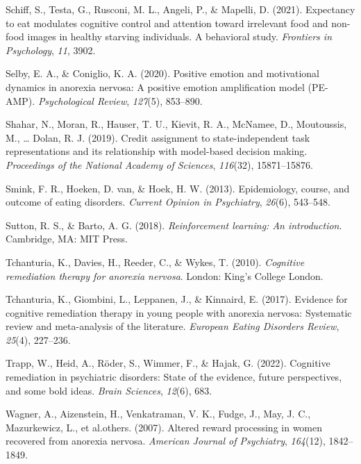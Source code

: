 \documentclass[
  man,floatsintext]{apa6}
\newlength{\cslhangindent}
\newlength{\cslentryspacingunit} %
\newenvironment{CSLReferences}[2] %
 {%
  \setlength{\parindent}{0pt}
  \ifodd #1
  \let\oldpar\par
  \def\par{\hangindent=\cslhangindent\oldpar}
  \fi
  \setlength{\parskip}{#2\cslentryspacingunit}
 }%
 {}
\begin{document}
\begin{CSLReferences}{1}{0}
\leavevmode{}%
Schiff, S., Testa, G., Rusconi, M. L., Angeli, P., \& Mapelli, D. (2021). Expectancy to eat modulates cognitive control and attention toward irrelevant food and non-food images in healthy starving individuals. A behavioral study. \emph{Frontiers in Psychology}, \emph{11}, 3902.

\leavevmode{}%
Selby, E. A., \& Coniglio, K. A. (2020). Positive emotion and motivational dynamics in anorexia nervosa: A positive emotion amplification model (PE-AMP). \emph{Psychological Review}, \emph{127}(5), 853--890.

\leavevmode{}%
Shahar, N., Moran, R., Hauser, T. U., Kievit, R. A., McNamee, D., Moutoussis, M., \ldots{} Dolan, R. J. (2019). Credit assignment to state-independent task representations and its relationship with model-based decision making. \emph{Proceedings of the National Academy of Sciences}, \emph{116}(32), 15871--15876.

\leavevmode{}%
Smink, F. R., Hoeken, D. van, \& Hoek, H. W. (2013). Epidemiology, course, and outcome of eating disorders. \emph{Current Opinion in Psychiatry}, \emph{26}(6), 543--548.

\leavevmode{}%
Sutton, R. S., \& Barto, A. G. (2018). \emph{Reinforcement learning: An introduction}. Cambridge, MA: MIT Press.

\leavevmode{}%
Tchanturia, K., Davies, H., Reeder, C., \& Wykes, T. (2010). \emph{Cognitive remediation therapy for anorexia nervosa}. London: King's College London.

\leavevmode{}%
Tchanturia, K., Giombini, L., Leppanen, J., \& Kinnaird, E. (2017). Evidence for cognitive remediation therapy in young people with anorexia nervosa: Systematic review and meta-analysis of the literature. \emph{European Eating Disorders Review}, \emph{25}(4), 227--236.

\leavevmode{}%
Trapp, W., Heid, A., Röder, S., Wimmer, F., \& Hajak, G. (2022). Cognitive remediation in psychiatric disorders: State of the evidence, future perspectives, and some bold ideas. \emph{Brain Sciences}, \emph{12}(6), 683.

\leavevmode{}%
Wagner, A., Aizenstein, H., Venkatraman, V. K., Fudge, J., May, J. C., Mazurkewicz, L., et al.others. (2007). Altered reward processing in women recovered from anorexia nervosa. \emph{American Journal of Psychiatry}, \emph{164}(12), 1842--1849.


\end{CSLReferences}
\end{document}
